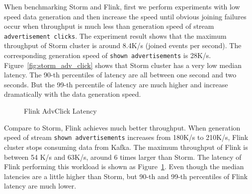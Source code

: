 When benchmarking Storm and Flink, first we perform experiments with low speed data generation and then increase the speed until obvious joining failures occur when throughput is much less than generation speed of stream \texttt{advertisement clicks}. The experiment result shows that the maximum throughput of Storm cluster is around 8.4K/s (joined events per second). The corresponding generation speed of \texttt{shown advertisements} is 28K/s. Figure~\ref{fig:storm_adv_click} shows that Storm cluster has a very low median latency. The 90-th percentiles of latency are all between one second and two seconds. But the 99-th percentile of latency are much higher and increase dramatically with the data generation speed.

\begin{figure}
  \begin{center}
   \caption{Flink AdvClick Latency}
   \label{fig:flink_adv_click}
  \end{center}
\end{figure}


Compare to Storm, Flink achieves much better throughput. When generation speed of stream \texttt{shown advertisements} increases from 180K/s to 210K/s, Flink cluster stops consuming data from Kafka. The maximum throughput of Flink is between 54 K/s and 63K/s, around 6 times larger than Storm. The latency of Flink performing this workload is shown as Figure~\ref{fig:flink_adv_click}. Even though the median latencies are a little higher than Storm, but 90-th and 99-th percentiles of Flink latency are much lower. 

